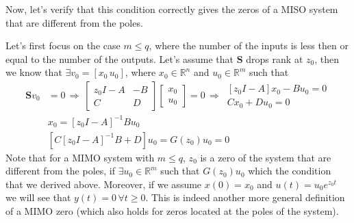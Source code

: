 \documentclass[twoside]{article}
\begin{document}
Now, let's verify that this condition correctly gives the zeros of a MISO system that are different from the poles. 

Let's first focus on the case $m \leq q$, where the number of the inputs is less then or equal to the number of the outputs. 
Let's assume that  $\mathbf{S}$ drops rank at $z_0$, then we know that $\exists v_0 = [x_0 \, u_0]$, where $x_0 \in \mathbb{R}^{n}$ and $u_0 \in \mathbb{R}^m$ such that 
%
%
\begin{align*}
\mathbf{S} v_0 &= 0
\, \Rightarrow \,
\left[ \begin{array}{cc} z_0 I - A & -B \\ C & D \end{array} \right] \left[ \begin{array}{c} x_0 \\ u_0 \end{array} \right] = 0
\, \Rightarrow \,
 \begin{array}{cc} \left[ z_0 I - A \right] x_0 - B u_0 = 0 \\ C x_0 + D u_0 = 0 \end{array}
 \\
 &x_0 =  \left[ z_0 I - A \right]^{-1} B u_0 \\
&\left[ C \left[ z_0 I - A \right]^{-1} B  + D \right] u_0 = G(z_0) u_0 =  0 
\end{align*}
%
Note that for a MIMO system with $m \leq q$, $z_0$ is a zero of the system that are different from the poles, 
if $\exists u_0 \in \mathbb{R}^m$ such that $G(z_0) u_0 $ which the condition that we derived above. Moreover, if we 
assume $x(0) = x_0$ and $u(t) = u_0 e^{z_0 t}$ we will see that $y(t) = 0 \, \forall t \geq 0$. This is indeed another more general definition of a MIMO zero (which also holds for zeros located at the poles of the system).
\end{document}

